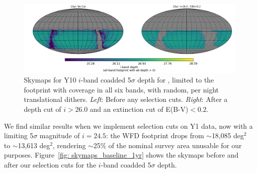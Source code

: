 \begin{figure}[H]
	\vspace*{2em}
	\centering\includegraphics[width=\linewidth,trim={30 40 40 40},clip=false]{figures/lss_final_footprint_skymap_baseline2018a_nside256_RandomDitherPerNight_10yr_iband.png}
	\vspace*{1em}
	\caption{Skymaps for Y10  $i$-band coadded 5$\sigma$ depth for , limited to the footprint with coverage in all six bands, with random, per night translational dithers. \textit{Left}: Before any selection cuts.  \textit{Right}: After a depth cut of $i>26.0$ and an extinction cut of E(B-V)$<0.2$.}
	\label{fig: skymaps_baseline_10yr}
\end{figure}

We find similar results when we implement selection cuts on Y1 data, now with a limiting 5$\sigma$ magnitude of $i=24.5$: the WFD footprint drops from $\sim$18,085 deg$^2$ to $\sim$13,613 deg$^2$, rendering $\sim$25\% of the nominal survey area unusable for our purposes.  Figure~\ref{fig: skymaps_baseline_1yr} shows the skymaps before and after our selection cuts for the $i$-band coadded 5$\sigma$  depth.

